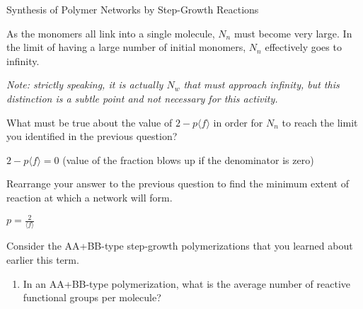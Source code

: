 \begin{activity}[extension]{Synthesis of Polymer Networks by Step-Growth Reactions}
\begin{ctqs}
		\begin{solution}[1.5in]
			As the monomers all link into a single molecule, $N_n$ must become very large.  In the limit of having a large number of initial monomers, $N_n$ effectively goes to infinity.
			
			\emph{Note: strictly speaking, it is actually $N_w$ that must approach infinity, but this distinction is a subtle point and not necessary for this activity.}
		\end{solution}
	
	\question What must be true about the value of $2-p\langle f \rangle$ in order for $N_n$ to reach the limit you identified in the previous question?
	
		\begin{solution}[1.5in]
			$2-p\langle f\rangle = 0$ (value of the fraction blows up if the denominator is zero)
		\end{solution}
	
	\question Rearrange your answer to the previous question to find the minimum extent of reaction at which a network will form.
	
		\begin{solution}[1in]
			$p = \frac{2}{\langle f \rangle}$
		\end{solution}
\end{ctqs}


\begin{exercises}

	
	
	
	\exercise Consider the AA+BB-type step-growth polymerizations that you learned about earlier this term.
	
		\begin{enumerate}
			\item In an AA+BB-type polymerization, what is the average number of reactive functional groups per molecule?
			
				\begin{solution}\end{solution}
			

\end{enumerate}
\end{exercises}
\end{activity}
